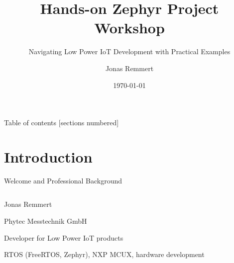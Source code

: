 \documentclass[10pt, aspectratio=169]{beamer}
\title{Hands-on Zephyr Project Workshop}
\subtitle{Navigating Low Power IoT Development with Practical Examples}
\author{Jonas Remmert}
\institute{IoT Embedded Systems Engineer at Phytec Messtechnik GmbH}
\date{\today}
\begin{document}
\begin{frame}
    \vspace*{0.5cm}  %
    \titlepage
\end{frame}
\begin{frame}{Table of contents}
  [sections numbered]
  \tableofcontents[]
\end{frame}
\section{Introduction}
\begin{frame}[fragile]{Welcome and Professional Background}
  \begin{columns}
    \begin{column}{0.6\textwidth}
      \begin{description}
        \item Jonas Remmert
        \item Phytec Messtechnik GmbH
        \item Developer for Low Power IoT products
        \item[Experience] RTOS (FreeRTOS, Zephyr), NXP MCUX, hardware development
      \end{description}
    \end{column}
    \begin{column}{0.4\textwidth}
    \end{column}
  \end{columns}
\end{frame}
\end{document}
